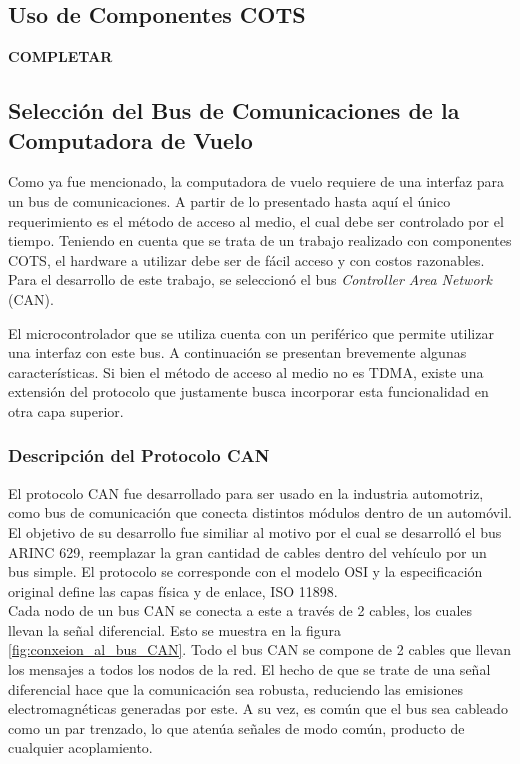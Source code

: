 \subsection{Uso de Componentes COTS}

\textbf{{\color{red} COMPLETAR}}

\subsection{Selección del Bus de Comunicaciones de la Computadora de Vuelo}

Como ya fue mencionado, la computadora de vuelo requiere de una interfaz para un bus de comunicaciones. A partir de lo presentado hasta aquí el único requerimiento es el método de acceso al medio, el cual debe ser controlado por el tiempo. Teniendo en cuenta que se trata de un trabajo realizado con componentes COTS, el hardware a utilizar debe ser de fácil acceso y con costos razonables. Para el desarrollo de este trabajo, se seleccionó el bus \textit{Controller Area Network} (CAN)\cite{specification1991bosch}. 


El microcontrolador que se utiliza cuenta con un periférico que permite utilizar una interfaz con este bus. A continuación se presentan brevemente algunas características. Si bien el método de acceso al medio no es TDMA, existe una extensión del protocolo que justamente busca incorporar esta funcionalidad en otra capa superior.

\subsubsection{Descripción del Protocolo CAN}

El protocolo CAN fue desarrollado para ser usado en la industria automotriz, como bus de comunicación que conecta distintos módulos dentro de un automóvil. El objetivo de su desarrollo fue similiar al motivo por el cual se desarrolló el bus ARINC 629, reemplazar la gran cantidad de cables dentro del vehículo por un bus simple. El protocolo se corresponde con el modelo OSI y la especificación original define las capas física y de enlace, ISO 11898.\\

Cada nodo de un bus CAN se conecta a este a través de 2 cables, los cuales llevan la señal diferencial. Esto se muestra en la figura \ref{fig:conxeion_al_bus_CAN}. Todo el bus CAN se compone de 2 cables que llevan los mensajes a todos los nodos de la red. El hecho de que se trate de una señal diferencial hace que la comunicación sea robusta, reduciendo las emisiones electromagnéticas generadas por este. A su vez, es común que el bus sea cableado como un par trenzado, lo que atenúa señales de modo común, producto de cualquier acoplamiento. 

